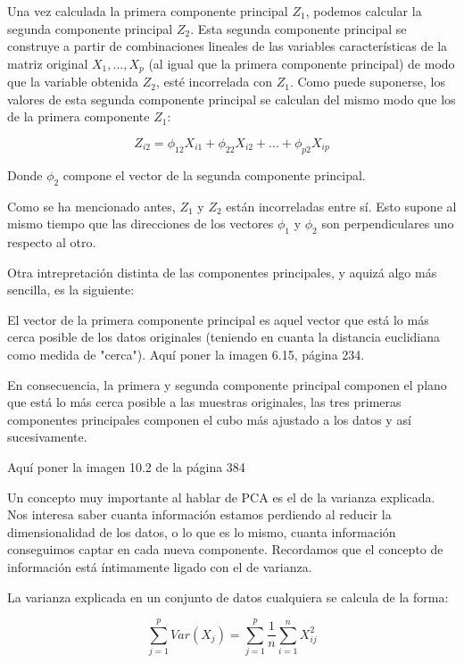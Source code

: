 \documentclass[12pt,a4paper,Spanish]{book}
\begin{document}
Una vez calculada la primera componente principal $Z_1$, podemos calcular la segunda componente principal $Z_2$. Esta segunda componente principal se construye a partir de combinaciones lineales de las variables características de la matriz original $X_1,...,X_p$ (al igual que la primera componente principal) de modo que la variable obtenida $Z_2$, esté incorrelada con $Z_1$. Como puede suponerse, los valores de esta segunda componente principal se calculan del mismo modo que los de la primera componente $Z_1$:

\begin{equation}
Z_{i2}=\phi_{12}X_{i1} + \phi_{22}X_{i2} + ... + \phi_{p2}X_{ip}
\end{equation}

Donde $\phi_{2}$ compone el vector de la segunda componente principal.

Como se ha mencionado antes, $Z_1$ y $Z_2$ están incorreladas entre sí. Esto supone al mismo tiempo que las direcciones de los vectores $\phi_{1}$ y $\phi_{2}$ son perpendiculares uno respecto al otro.

Otra intrepretación distinta de las componentes principales, y aquizá algo más sencilla, es la siguiente:

El vector de la primera componente principal es aquel vector que está lo más cerca posible de los datos originales (teniendo en cuanta la distancia euclidiana como medida de "cerca"). Aquí poner la imagen 6.15, página 234.

En consecuencia, la primera y segunda componente principal componen el plano que está lo más cerca posible a las muestras originales, las tres primeras componentes principales componen el cubo más ajustado a los datos y así sucesivamente.

Aquí poner la imagen 10.2 de la página 384


Un concepto muy importante al hablar de PCA es el de la varianza explicada. Nos interesa saber cuanta información estamos perdiendo al reducir la dimensionalidad de los datos, o lo que es lo mismo, cuanta información conseguimos captar en cada nueva componente. Recordamos que el concepto de información está íntimamente ligado con el de varianza.

La varianza explicada en un conjunto de datos cualquiera se calcula de la forma:

\begin{equation}
\sum_{j=1}^{p}Var(X_j) = \sum_{j=1}^{p}\dfrac{1}{n}\sum_{i=1}^{n}X_{ij}^2
\end{equation}
\end{document}
